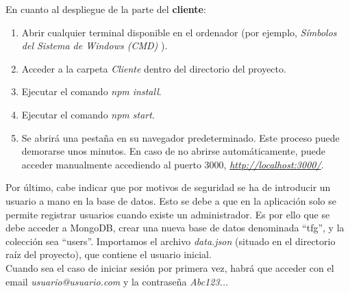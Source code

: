 En cuanto al despliegue de la parte del {\bf cliente}:
\begin{enumerate}
\item Abrir cualquier terminal disponible en el ordenador (por ejemplo, {\it Símbolos del Sistema de Windows (CMD)} \cite{cmd}).
\item Acceder a la carpeta {\it Cliente} dentro del directorio del proyecto.
\item Ejecutar el comando {\it npm install}.
\item Ejecutar el comando {\it npm start}.
\item Se abrirá una pestaña en su navegador predeterminado. Este proceso puede demorarse unos minutos. En caso de no abrirse automáticamente, puede acceder manualmente accediendo al puerto 3000, {\it \url{http://localhost:3000/}}.
\end{enumerate}

Por último, cabe indicar que por motivos de seguridad se ha de introducir un usuario a mano en la base de datos. Esto se debe a que en la aplicación solo se permite registrar usuarios cuando existe un administrador. Es por ello que se debe acceder a MongoDB, crear una nueva base de datos denominada ``tfg'', y la colección sea ``users''. Importamos el archivo {\it data.json} (situado en el directorio raíz del proyecto), que contiene el usuario inicial.
\\

Cuando sea el caso de iniciar sesión por primera vez, habrá que acceder con el email {\it usuario@usuario.com} y la contraseña {\it Abc123..}.